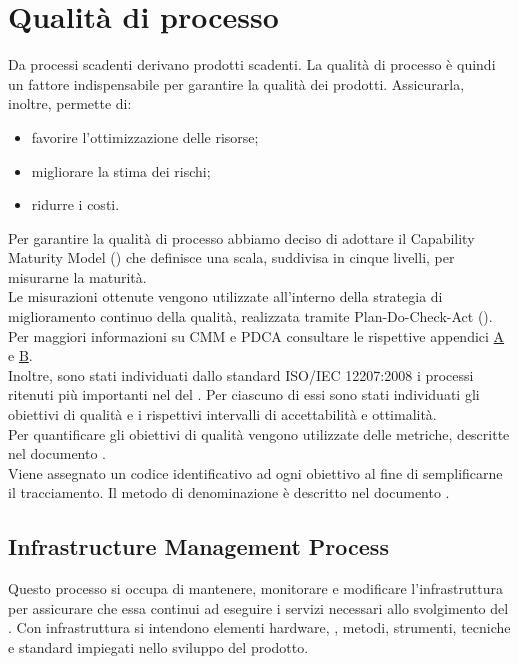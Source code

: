 \documentclass[PdQ.tex]{subfiles}
\begin{document}
\section{Qualità di processo}
	Da processi scadenti derivano prodotti scadenti. La qualità di processo è quindi un fattore
	indispensabile per garantire la qualità dei prodotti. Assicurarla, inoltre, permette di:
	\begin{itemize} 
		\item favorire l'ottimizzazione delle risorse;
		\item migliorare la stima dei rischi;
		\item ridurre i costi.
	\end{itemize}
	
	Per garantire la qualità di processo abbiamo deciso di adottare il Capability Maturity Model ()
	che definisce una scala, suddivisa in cinque livelli, per misurarne la maturità. \\
	Le misurazioni ottenute vengono utilizzate all'interno della strategia di miglioramento continuo della
	qualità, realizzata tramite Plan-Do-Check-Act (). \\
	Per maggiori informazioni su CMM e PDCA consultare le rispettive appendici \hyperlink{CMM}{A} e \hyperlink{PDCA}{B}. \\
	Inoltre, sono stati individuati dallo standard ISO/IEC 12207:2008 i processi ritenuti più importanti
	nel  del . Per ciascuno di essi sono stati individuati gli obiettivi di qualità
	e i rispettivi intervalli di accettabilità e ottimalità. \\
	Per quantificare gli obiettivi di qualità vengono utilizzate delle metriche, descritte nel documento
	\NPdocRP{}. \\
	Viene assegnato un codice identificativo ad ogni obiettivo al fine di semplificarne il tracciamento.
	Il metodo di denominazione è descritto nel documento \NPdocRP{}.
	
	\subsection{Infrastructure Management Process}
		Questo processo si occupa di mantenere, monitorare e modificare l'infrastruttura per assicurare
		che essa continui ad eseguire i servizi necessari allo svolgimento del .
		Con infrastruttura si intendono elementi hardware, , metodi, strumenti, tecniche e standard
		impiegati nello sviluppo del prodotto. \\
		
\end{document}
